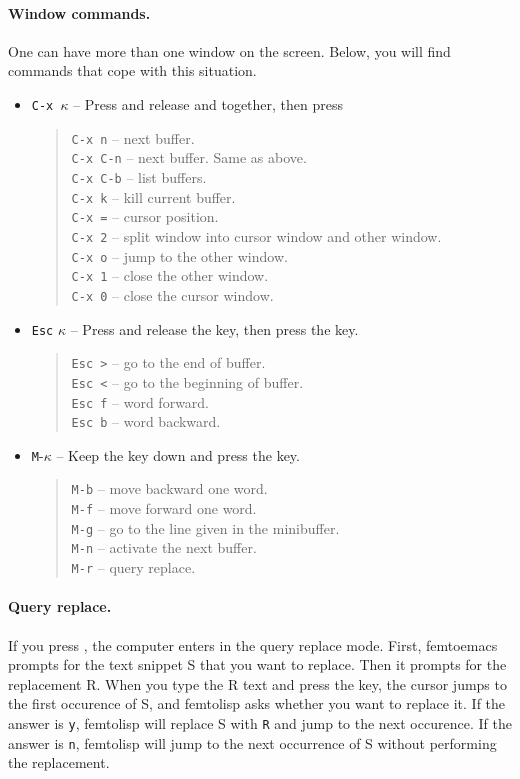 \documentclass[a4paper,12pt]{book}
\begin{document}
\paragraph{Window commands.} One can have more
than one window on the screen. Below, you will
find commands that cope with this situation.
\begin{itemize}
\item \verb|C-x |$\kappa$ -- Press and release 
and  together, then press \keys{$\kappa$} 
\begin{quote}
\verb|C-x n| -- next buffer.\\
\verb|C-x C-n| -- next buffer. Same as above.\\  
\verb|C-x C-b| -- list buffers.\\
\verb|C-x k| -- kill current buffer.\\
\verb|C-x =| -- cursor position.\\
\verb|C-x 2| -- split window into cursor window and other window.\\
\verb|C-x o| -- jump to the other window.\\
\verb|C-x 1| -- close the other window.\\
\verb|C-x 0| -- close the cursor window.
\end{quote}
\item \verb|Esc| $\kappa$ -- Press and release the  key,
then press the \keys{$\kappa$} key.
\begin{quote}
\verb|Esc >| -- go to the end of buffer.\\
\verb|Esc <| -- go to the beginning of buffer.\\ 
\verb|Esc f| -- word forward.\\
\verb|Esc b| -- word backward.\\
\end{quote}
\item \verb|M|-$\kappa$ -- Keep the  key
down and press the \keys{$\kappa$} key.
\begin{quote}
\verb|M-b| -- move backward one word.\\
\verb|M-f| -- move forward one word.\\
\verb|M-g| -- go to the line given in the minibuffer.\\
\verb|M-n| -- activate the next buffer.\\
\verb|M-r| -- query replace.
\end{quote}
\end{itemize}

\paragraph{Query replace.} If you press ,
the computer enters in the query replace mode.
First, femtoemacs prompts for the text snippet S
that you want to replace. Then it prompts for
the replacement R. When you type the R text and
press the  key, the cursor jumps to
the first occurence of S, and femtolisp
asks whether you want to
replace it. If the answer is
\verb|y|, femtolisp will replace S
with \verb|R| and jump to the next occurence.
If the answer is \verb|n|, femtolisp will
jump to the next occurrence of S without
performing the replacement.
\end{document}
